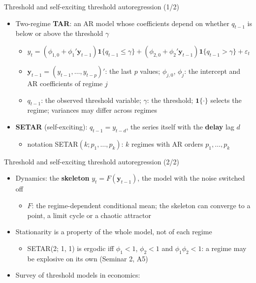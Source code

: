 \begin{frame}{Threshold and self-exciting threshold autoregression (1/2)}
\itemsize{\small}
\begin{itemize}
    \item Two-regime \textbf{TAR}: an AR model whose coefficients depend on whether $q_{t-1}$ is below or above the threshold $\gamma$
    \begin{itemize}
        \item $y_t = (\phi_{1,0} + \phi_1'\mathbf y_{t-1})\mathbf 1\{q_{t-1} \le \gamma\} + (\phi_{2,0} + \phi_2'\mathbf y_{t-1})\mathbf 1\{q_{t-1} > \gamma\} + \varepsilon_t$
        \item $\mathbf y_{t-1} = (y_{t-1}, \dots, y_{t-p})'$: the last $p$ values; $\phi_{j,0}$, $\phi_j$: the intercept and AR coefficients of regime $j$
        \item $q_{t-1}$: the observed threshold variable; $\gamma$: the threshold; $\mathbf 1\{\cdot\}$ selects the regime; variances may differ across regimes
    \end{itemize}
    \item \textbf{SETAR} (self-exciting): $q_{t-1} = y_{t-d}$, the series itself with the \textbf{delay} lag $d$
    \begin{itemize}
        \item notation SETAR$(k; p_1, \dots, p_k)$: $k$ regimes with AR orders $p_1, \dots, p_k$ 
    \end{itemize}
\end{itemize}
\end{frame}

\begin{frame}{Threshold and self-exciting threshold autoregression (2/2)}
\itemsize{\small}
\begin{itemize}
    \item Dynamics: the \textbf{skeleton} $y_t = F(\mathbf y_{t-1})$, the model with the noise switched off
    \begin{itemize}
        \item $F$: the regime-dependent conditional mean; the skeleton can converge to a point, a limit cycle or a chaotic attractor
    \end{itemize}
    \item Stationarity is a property of the whole model, not of each regime
    \begin{itemize}
        \item SETAR(2; 1, 1) is ergodic iff $\phi_1 < 1$, $\phi_2 < 1$ and $\phi_1\phi_2 < 1$: a regime may be explosive on its own (Seminar 2, A5)
    \end{itemize}
    \item Survey of threshold models in economics: 
\end{itemize}
\end{frame}

